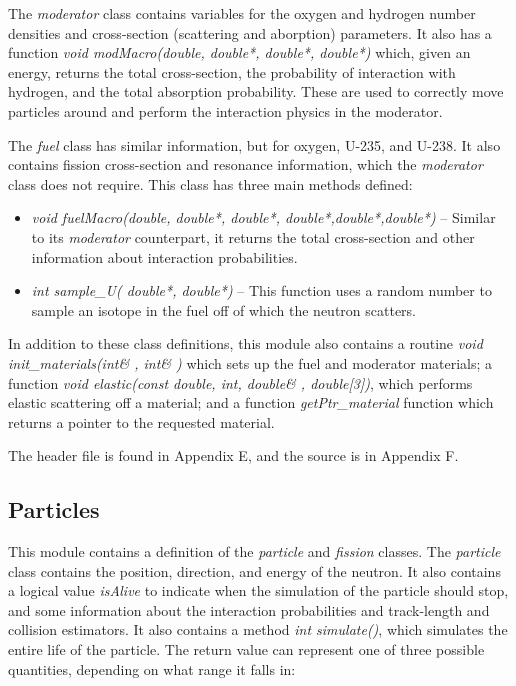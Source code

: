 The \textit{moderator} class contains variables for the oxygen and hydrogen number densities and cross-section (scattering and aborption) parameters.  It also has a function \textit{void modMacro(double, double*, double*, double*)} which, given an energy, returns the total cross-section, the probability of interaction with hydrogen, and the total absorption probability.  These are used to correctly move particles around and perform the interaction physics in the moderator.

The \textit{fuel} class has similar information, but for oxygen, U-235, and U-238.  It also contains fission cross-section and resonance information, which the \textit{moderator} class does not require.  This class has three main methods defined:

\begin{itemize}
\item \textit{void fuelMacro(double, double*, double*, double*,double*,double*)} -- Similar to its \textit{moderator} counterpart, it returns the total cross-section and other information about interaction probabilities.
\item \textit{int sample{\_}U( double*, double*)} -- This function uses a random number to sample an isotope in the fuel off of which the neutron scatters.
\end{itemize}

In addition to these class definitions, this module also contains a routine \textit{void init{\_}materials(int\& , int\& )} which sets up the fuel and moderator materials; a function \textit{void elastic(const double, int, double\& , double[3])}, which performs elastic scattering off a material; and a function \textit{getPtr{\_}material} function which returns a pointer to the requested material.

The header file is found in Appendix E, and the source is in Appendix F.

\subsection{Particles}\label{ss:particles}

This module contains a definition of the \textit{particle} and \textit{fission} classes.  The \textit{particle} class contains the position, direction, and energy of the neutron.  It also contains a logical value \textit{isAlive} to indicate when the simulation of the particle should stop, and some information about the interaction probabilities and track-length and collision estimators.  It also contains a method \textit{int simulate()}, which simulates the entire life of the particle.  The return value can represent one of three possible quantities, depending on what range it falls in:

